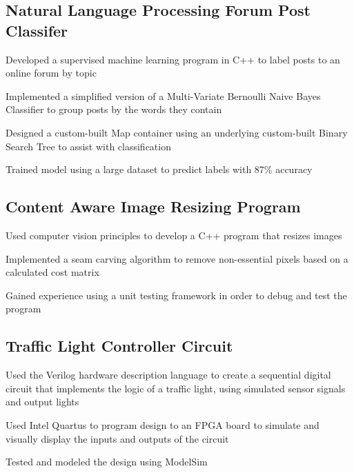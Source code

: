 \documentclass[letter,10pt]{article}
\begin{document}
\subsection{{Natural Language Processing Forum Post Classifer}}
\begin{zitemize}
\item Developed a supervised machine learning program in C++ to label posts to an online forum by topic
\item Implemented a simplified version of a Multi-Variate Bernoulli Naive Bayes Classifier to group posts by the words they contain
\item Designed a custom-built Map container using an underlying custom-built Binary Search Tree to assist with classification
\item Trained model using a large dataset to predict labels with 87\% accuracy
\end{zitemize}

\subsection{{Content Aware Image Resizing Program }}
\begin{zitemize}
\item Used computer vision principles to develop a C++ program that resizes images
\item Implemented a seam carving algorithm to remove non-essential pixels based on a calculated cost matrix 
\item Gained experience using a unit testing framework in order to debug and test the program
\end{zitemize}



\subsection{{Traffic Light Controller Circuit}}
\begin{zitemize}
\item Used the Verilog hardware description language to create a sequential digital circuit that implements the logic of a traffic light, using simulated sensor signals and output lights
\item Used Intel Quartus to program design to an FPGA board to simulate and visually display the inputs and outputs of the circuit
\item Tested and modeled the design using ModelSim
\end{zitemize}
\end{document}
